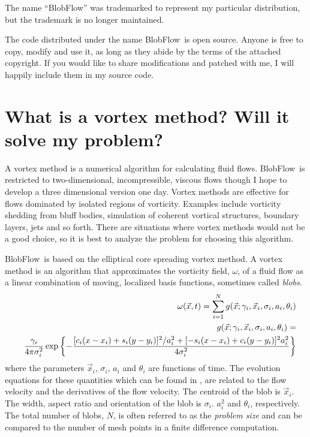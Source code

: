 \documentclass[12pt]{report}
\def\v#1{\vec{#1}}
\newcommand{\BF}{BlobFlow}
\begin{document}
The name ``BlobFlow'' was trademarked to
represent my particular distribution, but the trademark is no longer maintained.
 
The code distributed under the name \BF~is open source.
Anyone is free to copy, modify and use it, as long as they abide by the
terms of the attached copyright.  If you would like to share modifications and
patched with me, I will happily include them in my source code.

\section{What is a vortex method?  Will it solve my problem?}

A vortex method is a numerical algorithm for calculating fluid flows.
\BF~is restricted to two-dimensional, incompressible, viscous flows
though I hope to develop a three dimensional version one day.
Vortex methods are effective for flows dominated by isolated regions of
vorticity.  Examples include vorticity shedding from bluff bodies,
simulation of coherent vortical structures, boundary layers, jets and so
forth.  There are situations where vortex methods would not be a good
choice, so it is best to analyze the problem for choosing this algorithm.

\BF~is based on the elliptical core spreading vortex method.  A vortex
method is an algorithm that approximates the vorticity field, $\omega$, 
of a fluid flow
as a linear combination of moving, localized basis functions, sometimes
called {\em blobs}.
\begin{eqnarray}
&& \omega(\v x,t) = \sum_{i=1}^N g(\v x;\gamma_i,\v x_i,\sigma_i,a_i,\theta_i)
\nonumber \\
&& g(\v x;\gamma_i,\v x_i,\sigma_i,a_i,\theta_i) = \hfill \nonumber \\
&& {\gamma_i \over 4 \pi \sigma_i^2}
\exp\left\{
-{[c_i (x-x_i)+s_i (y-y_i)]^2/a_i^2 +
[-s_i (x-x_i)+c_i (y-y_i)]^2 a_i^2
\over
4 \sigma_i^2}
\right\}
\label{basis-fn}
\end{eqnarray}
where the parameters $\v x_i$, $\sigma_i$, $a_i$ and $\theta_i$ are
functions of time.  The evolution equations for these quantities which can
be found in \cite{rossi-deform-1,rossi-deform-2}, are related to the flow
velocity and the
derivatives of the flow velocity.  The centroid of the blob is $\v
x_i$. The width, aspect ratio and orientation of the blob is $\sigma_i$.
$a_i^2$ and $\theta_i$, respectively.  The total number of blobs, $N$, is
often referred to as the {\em problem size} and can be compared to the
number of mesh points in a finite difference computation.
\end{document}
